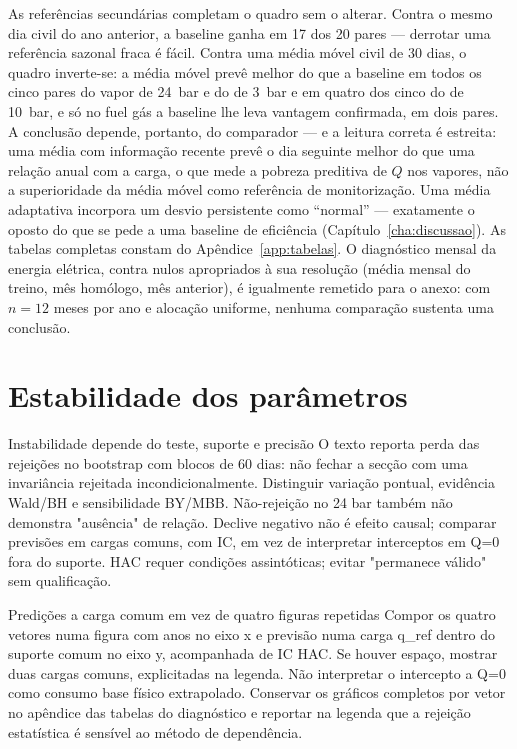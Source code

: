 As referências secundárias completam o quadro sem o alterar. Contra o mesmo
dia civil do ano anterior, a baseline ganha em 17 dos 20 pares --- derrotar
uma referência sazonal fraca é fácil. Contra uma média móvel civil de 30
dias, o quadro inverte-se: a média móvel prevê melhor do que a baseline em
todos os cinco pares do vapor de 24~bar e do de 3~bar e em quatro dos cinco
do de 10~bar, e só no fuel gás a baseline lhe leva vantagem confirmada, em
dois pares. A conclusão depende, portanto, do comparador --- e a leitura
correta é estreita: uma média com informação recente prevê o dia seguinte
melhor do que uma relação anual com a carga, o que mede a pobreza preditiva
de $Q$ nos vapores, não a superioridade da média móvel como referência de
monitorização. Uma média adaptativa incorpora um desvio persistente como
``normal'' --- exatamente o oposto do que se pede a uma baseline de eficiência
(Capítulo~\ref{cha:discussao}). As tabelas completas constam do
Apêndice~\ref{app:tabelas}. O diagnóstico mensal da energia elétrica, contra
nulos apropriados à sua resolução (média mensal do treino, mês homólogo, mês
anterior), é igualmente remetido para o anexo: com $n{=}12$ meses por ano e
alocação uniforme, nenhuma comparação sustenta uma conclusão.

\section{Estabilidade dos parâmetros}
\label{sec:estabilidade}
{Instabilidade depende do teste, suporte e precisão}
{O texto reporta perda das rejeições no bootstrap com blocos de 60 dias:
não fechar a secção com uma invariância rejeitada incondicionalmente.
Distinguir variação pontual, evidência Wald/BH e sensibilidade BY/MBB.
Não-rejeição no 24 bar também não demonstra "ausência" de relação.
Declive negativo não é efeito causal; comparar previsões em cargas
comuns, com IC, em vez de interpretar interceptos em Q=0 fora do suporte.
HAC requer condições assintóticas; evitar "permanece válido" sem qualificação.}%

{Predições a carga comum em vez de quatro figuras repetidas}
{Compor os quatro vetores numa figura com anos no eixo x e previsão
numa carga q\_ref dentro do suporte comum no eixo y, acompanhada de IC HAC.
Se houver espaço, mostrar duas cargas comuns, explicitadas na legenda.
Não interpretar o intercepto a Q=0 como consumo base físico extrapolado.
Conservar os gráficos completos por vetor no apêndice das tabelas do diagnóstico e reportar na
legenda que a rejeição estatística é sensível ao método de dependência.}%

